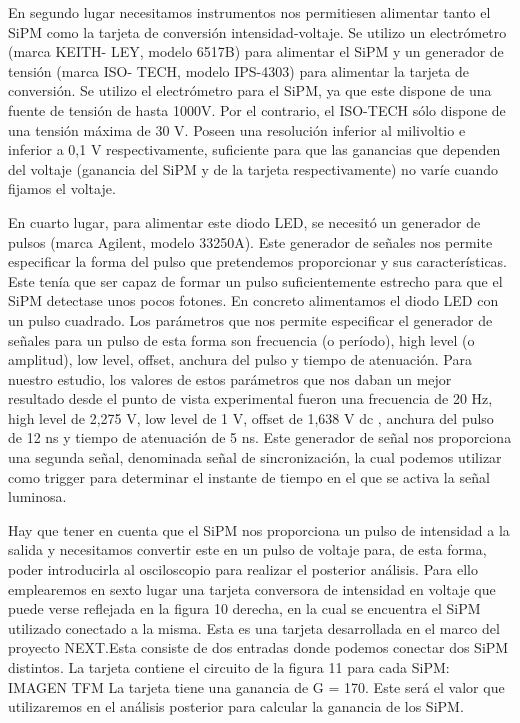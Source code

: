 En segundo lugar necesitamos instrumentos nos permitiesen alimentar tanto el SiPM como
la tarjeta de conversión intensidad-voltaje. Se utilizo un electrómetro (marca KEITH-
LEY, modelo 6517B) para alimentar el SiPM y un generador de tensión (marca ISO-
TECH, modelo IPS-4303) para alimentar la tarjeta de conversión.
Se utilizo el electrómetro para el SiPM, ya que este dispone de una fuente de tensión de hasta
1000V. Por el contrario, el ISO-TECH sólo dispone de una tensión máxima de 30 V. Poseen
una resolución inferior al milivoltio e inferior a 0,1 V respectivamente, suficiente para que
las ganancias que dependen del voltaje (ganancia del SiPM y de la tarjeta respectivamente)
no varíe cuando fijamos el voltaje.

En cuarto lugar, para alimentar este diodo LED, se necesitó un generador de pulsos
(marca Agilent, modelo 33250A). Este generador de señales nos permite especificar la
forma del pulso que pretendemos proporcionar y sus características. Este tenía que ser
capaz de formar un pulso suficientemente estrecho para que el SiPM detectase unos pocos
fotones.
En concreto alimentamos el diodo LED con un pulso cuadrado. Los parámetros que nos
permite especificar el generador de señales para un pulso de esta forma son frecuencia (o
período), high level (o amplitud), low level, offset, anchura del pulso y tiempo de atenuación.
Para nuestro estudio, los valores de estos parámetros que nos daban un mejor resultado
desde el punto de vista experimental fueron una frecuencia de 20 Hz, high level de 2,275 V,
low level de 1 V, offset de 1,638 V dc , anchura del pulso de 12 ns y tiempo de atenuación
de 5 ns. Este generador de señal nos proporciona una segunda señal, denominada señal de
sincronización, la cual podemos utilizar como trigger para determinar el instante de tiempo
en el que se activa la señal luminosa.

Hay que tener en cuenta que el SiPM nos proporciona un pulso de intensidad a la salida y
necesitamos convertir este en un pulso de voltaje para, de esta forma, poder introducirla
al osciloscopio para realizar el posterior análisis. Para ello emplearemos en sexto lugar una
tarjeta conversora de intensidad en voltaje que puede verse reflejada en la figura 10
derecha, en la cual se encuentra el SiPM utilizado conectado a la misma.
Esta es una tarjeta desarrollada en el marco del proyecto NEXT.Esta consiste de dos
entradas donde podemos conectar dos SiPM distintos. La tarjeta contiene el circuito de la
figura 11 para cada SiPM:
IMAGEN TFM
La tarjeta tiene una ganancia de G = 170. Este será el valor que utilizaremos en el análisis
posterior para calcular la ganancia de los SiPM.



